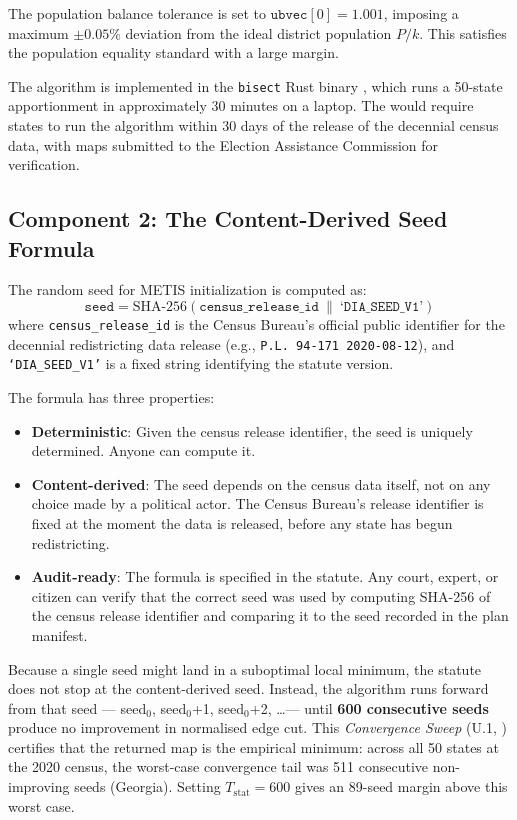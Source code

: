 The population balance tolerance is set to $\texttt{ubvec}[0] = 1.001$,
imposing a maximum $\pm 0.05\%$ deviation from the ideal district population
$P/k$.
This satisfies the \karcher{} population equality standard with a large margin.

The algorithm is implemented in the \texttt{bisect} Rust binary
\citep{b0paper}, which runs a 50-state apportionment in approximately
30 minutes on a laptop.
The \dia{} would require states to run the algorithm within 30 days of
the release of the decennial census data, with maps submitted to the
Election Assistance Commission for verification.

\subsection{Component 2: The Content-Derived Seed Formula}

The random seed for METIS initialization is computed as:
\[
  \texttt{seed} = \text{SHA-256}(\texttt{census\_release\_id}\ \|\ \texttt{`DIA\_SEED\_V1'})
\]
where \texttt{census\_release\_id} is the Census Bureau's official public
identifier for the decennial redistricting data release (e.g.,
\texttt{P.L.\ 94-171\ 2020-08-12}), and \texttt{`DIA\_SEED\_V1'} is a
fixed string identifying the statute version.

The formula has three properties:
\begin{itemize}
  \item \textbf{Deterministic}: Given the census release identifier, the seed
    is uniquely determined.
    Anyone can compute it.
  \item \textbf{Content-derived}: The seed depends on the census data itself,
    not on any choice made by a political actor.
    The Census Bureau's release identifier is fixed at the moment the data
    is released, before any state has begun redistricting.
  \item \textbf{Audit-ready}: The formula is specified in the statute.
    Any court, expert, or citizen can verify that the correct seed was used
    by computing SHA-256 of the census release identifier and comparing it
    to the seed recorded in the plan manifest.
\end{itemize}

Because a single seed might land in a suboptimal local minimum, the statute
does not stop at the content-derived seed.
Instead, the algorithm runs forward from that seed — seed$_0$, seed$_0$+1,
seed$_0$+2, \ldots --- until \textbf{600 consecutive seeds} produce no
improvement in normalised edge cut.
This \emph{Convergence Sweep} (U.1, \citealt{b16paper}) certifies that the
returned map is the empirical minimum: across all 50 states at the 2020
census, the worst-case convergence tail was 511 consecutive non-improving seeds
(Georgia).
Setting $T_{\text{stat}} = 600$ gives an 89-seed margin above this worst case.

